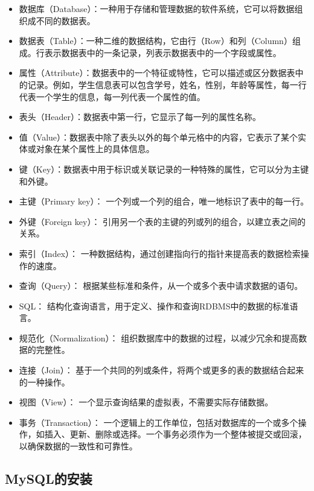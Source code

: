 \begin{itemize}
\item 数据库（Database）：一种用于存储和管理数据的软件系统，它可以将数据组织成不同的数据表。
\item 数据表（Table）：一种二维的数据结构，它由行（Row）和列（Column）组成。行表示数据表中的一条记录，列表示数据表中的一个字段或属性。
\item 属性（Attribute）：数据表中的一个特征或特性，它可以描述或区分数据表中的记录。例如，学生信息表可以包含学号，姓名，性别，年龄等属性，每一行代表一个学生的信息，每一列代表一个属性的值。
\item 表头（Header）：数据表中第一行，它显示了每一列的属性名称。
\item 值（Value）：数据表中除了表头以外的每个单元格中的内容，它表示了某个实体或对象在某个属性上的具体信息。
\item 键（Key）：数据表中用于标识或关联记录的一种特殊的属性，它可以分为主键和外键。
\item 主键（Primary key）： 一个列或一个列的组合，唯一地标识了表中的每一行。
\item 外键（Foreign key）： 引用另一个表的主键的列或列的组合，以建立表之间的关系。
\item 索引（Index）： 一种数据结构，通过创建指向行的指针来提高表的数据检索操作的速度。
\item 查询（Query）： 根据某些标准和条件，从一个或多个表中请求数据的语句。
\item SQL： 结构化查询语言，用于定义、操作和查询RDBMS中的数据的标准语言。
\item 规范化（Normalization）： 组织数据库中的数据的过程，以减少冗余和提高数据的完整性。
\item 连接（Join）： 基于一个共同的列或条件，将两个或更多的表的数据结合起来的一种操作。
\item 视图（View）： 一个显示查询结果的虚拟表，不需要实际存储数据。
\item 事务（Transaction）： 一个逻辑上的工作单位，包括对数据库的一个或多个操作，如插入、更新、删除或选择。一个事务必须作为一个整体被提交或回滚，以确保数据的一致性和可靠性。
\end{itemize}

\subsection{MySQL的安装}